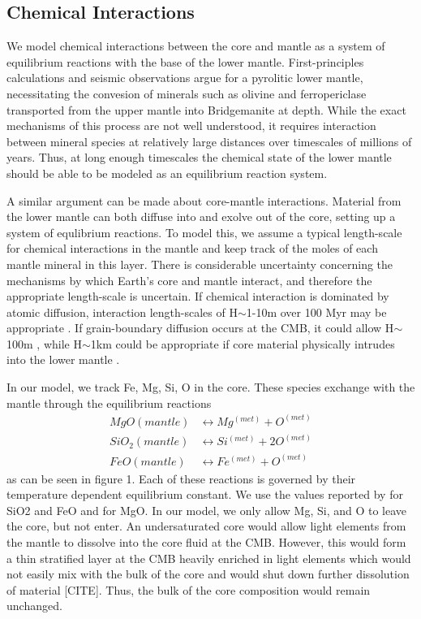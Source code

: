 \documentclass[]{article}
\begin{document}
	\subsection{Chemical Interactions}\label{chemical-interaction-layer}
	We model chemical interactions between the core and mantle as a system of equilibrium reactions with the base of the lower mantle. First-principles calculations and seismic observations argue for a pyrolitic lower mantle, necessitating the convesion of minerals such as olivine and ferropericlase transported from the upper mantle into Bridgemanite at depth. While the exact mechanisms of this process are not well understood, it requires interaction between mineral species at relatively large distances over timescales of millions of years. Thus, at long enough timescales the chemical state of the lower mantle should be able to be modeled as an equilibrium reaction system.
	
	A similar argument can be made about core-mantle interactions. Material from the lower mantle can both diffuse into and exolve out of the core, setting up a system of equlibrium reactions. To model this, we assume a typical length-scale for chemical interactions in the mantle and keep track of the moles of each mantle mineral in this layer. There is considerable uncertainty concerning the mechanisms by which Earth's core and mantle interact, and therefore the appropriate length-scale is uncertain. If chemical interaction is dominated by atomic diffusion, interaction length-scales of H$\sim$1-10m over 100 Myr may be appropriate \citet{Bina2010,VanOrman2003}. If grain-boundary diffusion occurs at the CMB, it could allow H$\sim$100m \citet{Hayden2007}, while H$\sim$1km could be appropriate if core material physically intrudes into the lower mantle \citep{Kanda2006}.
	
	In our model, we track Fe, Mg, Si, O in the core. These species exchange with the mantle through the equilibrium reactions
	\begin{align}
	MgO (mantle) &\leftrightarrow Mg^{(met)} + O^{(met)} \label{eq:m1}\\
	SiO_2 (mantle) &\leftrightarrow Si^{(met)} +2 O^{(met)}\label{eq:m2}\\
	FeO (mantle) &\leftrightarrow Fe^{(met)} +O^{(met)}\label{eq:m3}
	\end{align}
	as can be seen in figure 1. Each of these reactions is governed by their temperature dependent equilibrium constant. We use the values reported by \citep{Hirose2017} for SiO2 and FeO and \citep{Badro2016} for MgO. 	In our model, we only allow Mg, Si, and O to leave the core, but not enter. An undersaturated core would allow light elements from the mantle to dissolve into the core fluid at the CMB. However, this would form a thin stratified layer at the CMB heavily enriched in light elements which would not easily mix with the bulk of the core and would shut down further dissolution of material [CITE]. Thus, the bulk of the core composition would remain unchanged.
	
\end{document}

